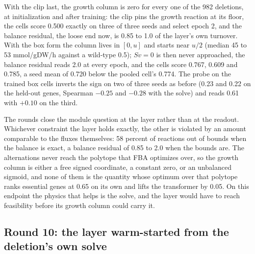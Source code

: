 


With the clip last, the growth column is zero for every one of the 982 deletions, at
initialization and after training: the clip pins the growth reaction at its floor, the
cells score 0.500 exactly on three of three seeds and select epoch 2, and the balance
residual, the loose end now, is 0.85 to 1.0 of the layer's own turnover. With the box
form the column lives in $[0, u]$ and starts near $u/2$ (median 45 to 53 mmol/gDW/h
against a wild-type 0.5); $Sv = 0$ is then never approached, the balance residual reads
2.0 at every epoch, and the cells score 0.767, 0.609 and 0.785, a seed mean of 0.720
below the pooled cell's 0.774. The probe on the trained box cells inverts the sign on two
of three seeds as before (0.23 and 0.22 on the held-out genes, Spearman $-0.25$ and
$-0.28$ with the solve) and reads 0.61 with $+0.10$ on the third.

The rounds close the module question at the layer rather than at the readout. Whichever
constraint the layer holds exactly, the other is violated by an amount comparable to the
fluxes themselves: 58 percent of reactions out of bounds when the balance is exact, a
balance residual of 0.85 to 2.0 when the bounds are. The alternations never reach the
polytope that FBA optimizes over, so the growth column is either a free signed
coordinate, a constant zero, or an unbalanced sigmoid, and none of them is the quantity
whose optimum over that polytope ranks essential genes at 0.65 on its own and lifts the
transformer by 0.05. On this endpoint the physics that helps is the solve, and the layer
would have to reach feasibility before its growth column could carry it.

\subsection{Round 10: the layer warm-started from the deletion's own solve}

